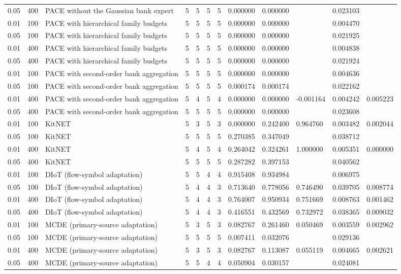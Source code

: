 \begin{tabular}{llllllllllll}
0.05 & 400 & PACE without the Gaussian bank expert & 5 & 5 & 5 & 5 & 0.000000 & 0.000000 &  & 0.023103 &  \\
0.01 & 100 & PACE with hierarchical family budgets & 5 & 5 & 5 & 5 & 0.000000 & 0.000000 &  & 0.004470 &  \\
0.05 & 100 & PACE with hierarchical family budgets & 5 & 5 & 5 & 5 & 0.000000 & 0.000000 &  & 0.021925 &  \\
0.01 & 400 & PACE with hierarchical family budgets & 5 & 5 & 5 & 5 & 0.000000 & 0.000000 &  & 0.004838 &  \\
0.05 & 400 & PACE with hierarchical family budgets & 5 & 5 & 5 & 5 & 0.000000 & 0.000000 &  & 0.021924 &  \\
0.01 & 100 & PACE with second-order bank aggregation & 5 & 5 & 5 & 5 & 0.000000 & 0.000000 &  & 0.004636 &  \\
0.05 & 100 & PACE with second-order bank aggregation & 5 & 5 & 5 & 5 & 0.000174 & 0.000174 &  & 0.022162 &  \\
0.01 & 400 & PACE with second-order bank aggregation & 5 & 4 & 5 & 4 & 0.000000 & 0.000000 & -0.001164 & 0.004242 & 0.005223 \\
0.05 & 400 & PACE with second-order bank aggregation & 5 & 5 & 5 & 5 & 0.000000 & 0.000000 &  & 0.023608 &  \\
0.01 & 100 & KitNET & 5 & 3 & 5 & 3 & 0.000000 & 0.242400 & 0.964760 & 0.003482 & 0.002044 \\
0.05 & 100 & KitNET & 5 & 5 & 5 & 5 & 0.270385 & 0.347049 &  & 0.038712 &  \\
0.01 & 400 & KitNET & 5 & 4 & 5 & 4 & 0.264042 & 0.324261 & 1.000000 & 0.005351 & 0.000000 \\
0.05 & 400 & KitNET & 5 & 5 & 5 & 5 & 0.287282 & 0.397153 &  & 0.040562 &  \\
0.01 & 100 & DIoT (flow-symbol adaptation) & 5 & 5 & 4 & 4 & 0.915408 & 0.934984 &  & 0.006975 &  \\
0.05 & 100 & DIoT (flow-symbol adaptation) & 5 & 4 & 4 & 3 & 0.713640 & 0.778056 & 0.746490 & 0.039705 & 0.008774 \\
0.01 & 400 & DIoT (flow-symbol adaptation) & 5 & 4 & 4 & 3 & 0.764007 & 0.950934 & 0.751669 & 0.008763 & 0.001462 \\
0.05 & 400 & DIoT (flow-symbol adaptation) & 5 & 4 & 4 & 3 & 0.416551 & 0.432569 & 0.732972 & 0.038365 & 0.009032 \\
0.01 & 100 & MCDE (primary-source adaptation) & 5 & 3 & 5 & 3 & 0.082767 & 0.261460 & 0.050469 & 0.003559 & 0.002962 \\
0.05 & 100 & MCDE (primary-source adaptation) & 5 & 5 & 5 & 5 & 0.007411 & 0.032076 &  & 0.029136 &  \\
0.01 & 400 & MCDE (primary-source adaptation) & 5 & 3 & 5 & 3 & 0.082767 & 0.113087 & 0.055119 & 0.004665 & 0.002621 \\
0.05 & 400 & MCDE (primary-source adaptation) & 5 & 5 & 4 & 4 & 0.050904 & 0.030157 &  & 0.024081 &  \\
\bottomrule
\end{tabular}

